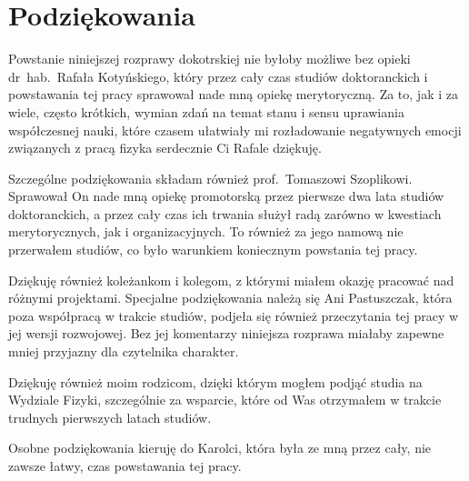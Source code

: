 \documentclass[pdflatex,11pt]{aghdpl}
\author{Marcin Stolarek}
\date{2016}
\begin{document}
\frontmatter

\titlepages

\section*{Podziękowania}
Powstanie niniejszej rozprawy dokotrskiej nie byłoby możliwe bez opieki dr~hab.~Rafała Kotyńskiego, który przez cały czas studiów doktoranckich i powstawania tej pracy sprawował nade mną opiekę merytoryczną. Za to, jak i za wiele, często krótkich, wymian zdań na temat stanu i sensu uprawiania współczesnej nauki, które czasem ułatwiały mi rozładowanie negatywnych emocji związanych z pracą fizyka serdecznie Ci Rafale dziękuję.

Szczególne podziękowania składam również prof.~Tomaszowi Szoplikowi. Sprawował On nade mną opiekę promotorską przez pierwsze dwa lata studiów doktoranckich, a przez cały czas ich trwania służył radą zarówno w kwestiach merytorycznych, jak i organizacyjnych. To również za jego namową nie przerwałem studiów, co było warunkiem koniecznym powstania tej pracy.

Dziękuję również koleżankom i kolegom, z którymi miałem okazję pracować nad różnymi projektami. Specjalne podziękowania należą się Ani Pastuszczak, która poza współpracą w trakcie studiów, podjeła się również przeczytania tej pracy w jej wersji rozwojowej. Bez jej komentarzy niniejsza rozprawa miałaby zapewne mniej przyjazny dla czytelnika charakter.

Dziękuję również moim rodzicom, dzięki którym mogłem podjąć studia na Wydziale Fizyki, szczególnie za wsparcie, które od Was otrzymałem w trakcie trudnych pierwszych latach studiów.  

Osobne podziękowania kieruję do Karolci, która była ze mną przez cały, nie zawsze łatwy, czas powstawania tej pracy.
\clearpage

\tableofcontents
\clearpage

\mainmatter


















\printnomenclature

%



\listoffigures
{}

\end{document}
